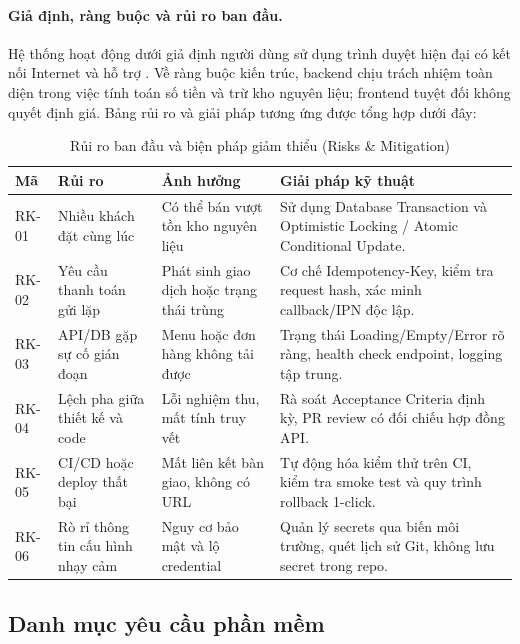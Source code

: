 \paragraph{Giả định, ràng buộc và rủi ro ban đầu.}
Hệ thống hoạt động dưới giả định người dùng sử dụng trình duyệt hiện đại có kết nối Internet và hỗ trợ . Về ràng buộc kiến trúc, backend chịu trách nhiệm toàn diện trong việc tính toán số tiền và trừ kho nguyên liệu; frontend tuyệt đối không quyết định giá. Bảng rủi ro và giải pháp tương ứng được tổng hợp dưới đây:

\begin{table}[H]
\centering\footnotesize
\caption{Rủi ro ban đầu và biện pháp giảm thiểu (Risks \& Mitigation)}
\label{tab:risks}
\begin{tabularx}{\textwidth}{@{}p{1.4cm} p{3.2cm} p{3.5cm} X@{}}
\toprule
\textbf{Mã} & \textbf{Rủi ro} & \textbf{Ảnh hưởng} & \textbf{Giải pháp kỹ thuật} \\
\midrule
RK-01 & Nhiều khách đặt cùng lúc & Có thể bán vượt tồn kho nguyên liệu & Sử dụng Database Transaction và Optimistic Locking / Atomic Conditional Update. \\
RK-02 & Yêu cầu thanh toán gửi lặp & Phát sinh giao dịch hoặc trạng thái trùng & Cơ chế Idempotency-Key, kiểm tra request hash, xác minh callback/IPN độc lập. \\
RK-03 & API/DB gặp sự cố gián đoạn & Menu hoặc đơn hàng không tải được & Trạng thái Loading/Empty/Error rõ ràng, health check endpoint, logging tập trung. \\
RK-04 & Lệch pha giữa thiết kế và code & Lỗi nghiệm thu, mất tính truy vết & Rà soát Acceptance Criteria định kỳ, PR review có đối chiếu hợp đồng API. \\
RK-05 & CI/CD hoặc deploy thất bại & Mất liên kết bàn giao, không có URL & Tự động hóa kiểm thử trên CI, kiểm tra smoke test và quy trình rollback 1-click. \\
RK-06 & Rò rỉ thông tin cấu hình nhạy cảm & Nguy cơ bảo mật và lộ credential & Quản lý secrets qua biến môi trường, quét lịch sử Git, không lưu secret trong repo. \\
\bottomrule
\end{tabularx}
\end{table}

\subsection{Danh mục yêu cầu phần mềm}

